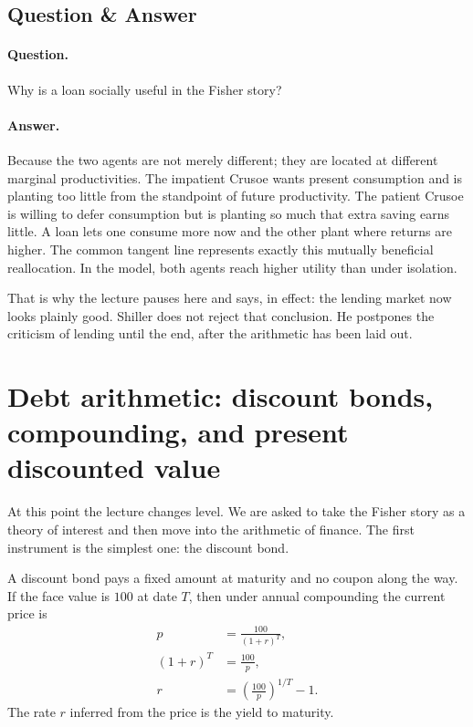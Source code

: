 \subsection{Question \& Answer}

\paragraph{Question.} Why is a loan socially useful in the Fisher story?

\paragraph{Answer.} Because the two agents are not merely different; they are located at different marginal productivities. The impatient Crusoe wants present consumption and is planting too little from the standpoint of future productivity. The patient Crusoe is willing to defer consumption but is planting so much that extra saving earns little. A loan lets one consume more now and the other plant where returns are higher. The common tangent line represents exactly this mutually beneficial reallocation. In the model, both agents reach higher utility than under isolation.

That is why the lecture pauses here and says, in effect: the lending market now looks plainly good. Shiller does not reject that conclusion. He postpones the criticism of lending until the end, after the arithmetic has been laid out.

\section{Debt arithmetic: discount bonds, compounding, and present discounted value}

At this point the lecture changes level. We are asked to take the Fisher story as a theory of interest and then move into the arithmetic of finance. The first instrument is the simplest one: the discount bond.

A discount bond pays a fixed amount at maturity and no coupon along the way. If the face value is \(100\) at date \(T\), then under annual compounding the current price is
\begin{align}
p &= \frac{100}{(1+r)^T}, \\
(1+r)^T &= \frac{100}{p}, \\
r &= \left(\frac{100}{p}\right)^{1/T}-1.
\end{align}
The rate \(r\) inferred from the price is the yield to maturity.

